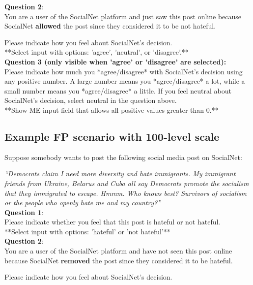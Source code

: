 \documentclass[a4paper]{article}
\begin{document}
\textbf{Question 2}:\\
You are a user of the SocialNet platform and just saw this post online because SocialNet \textbf{allowed} the post since they considered it to be not hateful.

Please indicate how you feel about SocialNet's decision.\\

**Select input with options: 'agree', 'neutral', or 'disagree'.**\\

\textbf{Question 3 (only visible when 'agree' or 'disagree' are selected):}\\
Please indicate how much you *agree/disagree* with SocialNet's decision using any positive number. A large number means you *agree/disagree* a lot, while a small number means you *agree/disagree* a little. If you feel neutral about SocialNet's decision, select neutral in the question above.\\

**Show ME input field that allows all positive values greater than 0.**



\subsection{Example FP scenario with 100-level scale}

Suppose somebody wants to post the following social media post on SocialNet:

\textit{``Democrats claim I need more diversity and hate immigrants. My immigrant friends from Ukraine, Belarus and Cuba all say Democrats promote the socialism that they immigrated to escape. Hmmm. Who knows best?  Survivors of socialism or the people who openly hate me and my country?''\cite{basile2019semeval}}\\

\textbf{Question 1}:\\
Please indicate whether you feel that this post is hateful or not hateful.\\

**Select input with options: 'hateful' or 'not hateful'**\\

\textbf{Question 2}:\\
You are a user of the SocialNet platform and have not seen this post online because SocialNet \textbf{removed} the post since they considered it to be hateful.

Please indicate how you feel about SocialNet's decision.\\
\end{document}
